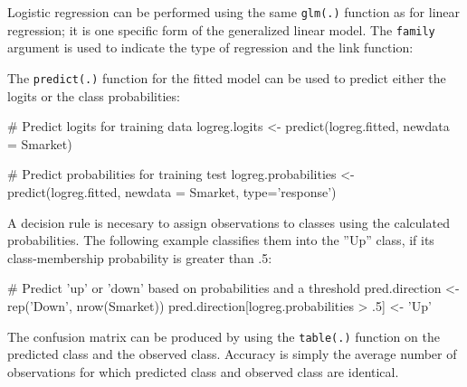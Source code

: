 Logistic regression can be performed using the same \texttt{glm(.)} function as for linear regression; it is one specific form of the generalized linear model. The \texttt{family} argument is used to indicate the type of regression and the link function:

\begin{samepage}
\end{samepage}

The \texttt{predict(.)} function for the fitted model can be used to predict either the logits or the class probabilities:

\begin{samepage}
\begin{Rcode}
# Predict logits for training data
logreg.logits <- predict(logreg.fitted, newdata = Smarket)

# Predict probabilities for training test
logreg.probabilities <- predict(logreg.fitted, newdata = Smarket, 
                                   type='response')
\end{Rcode}
\end{samepage}

A decision rule is necesary to assign observations to classes using the calculated probabilities. The following example classifies them into the ''Up'' class, if its class-membership probability is greater than .5:

\begin{samepage}
\begin{Rcode}
# Predict 'up' or 'down' based on probabilities and a threshold
pred.direction <- rep('Down', nrow(Smarket))
pred.direction[logreg.probabilities > .5] <- 'Up'
\end{Rcode}
\end{samepage}

The confusion matrix can be produced by using the \texttt{table(.)} function on the predicted class and the observed class. Accuracy is simply the average number of observations for which predicted class and observed class are identical.


